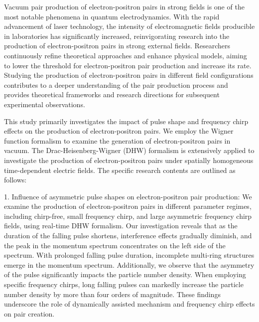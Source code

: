 \begin{abstract*}
Vacuum pair production of electron-positron pairs in strong fields is one of the most notable phenomena in quantum electrodynamics. With the rapid advancement of laser technology, the intensity of electromagnetic fields producible in laboratories has significantly increased, reinvigorating research into the production of electron-positron pairs in strong external fields. Researchers continuously refine theoretical approaches and enhance physical models, aiming to lower the threshold for electron-positron pair production and increase its rate. Studying the production of electron-positron pairs in different field configurations contributes to a deeper understanding of the pair production process and provides theoretical frameworks and research directions for subsequent experimental observations.

This study primarily investigates the impact of pulse shape and frequency chirp effects on the production of electron-positron pairs. We employ the Wigner function formalism to examine the generation of electron-positron pairs in vacuum. The Drac-Heisenberg-Wigner (DHW) formalism is extensively applied to investigate the production of electron-positron pairs under spatially homogeneous time-dependent electric fields. The specific research contents are outlined as follows:

1. Influence of asymmetric pulse shapes on electron-positron pair production: We examine the production of electron-positron pairs in different parameter regimes, including chirp-free, small frequency chirp, and large asymmetric frequency chirp fields, using real-time DHW formalism. Our investigation reveals that as the duration of the falling pulse shortens, interference effects gradually diminish, and the peak in the momentum spectrum concentrates on the left side of the spectrum. With prolonged falling pulse duration, incomplete multi-ring structures emerge in the momentum spectrum. Additionally, we observe that the asymmetry of the pulse significantly impacts the particle number density. When employing specific frequency chirps, long falling pulses can markedly increase the particle number density by more than four orders of magnitude. These findings underscore the role of dynamically assisted mechanism and frequency chirp effects on pair creation. 


\end{abstract*}
